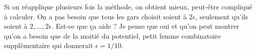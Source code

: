 \documentclass[10pt, conference, letterpaper]{IEEEtran}
\begin{document}
Si on réapplique plusieurs fois la méthode, on obtient mieux, peut-être compliqué à calculer.
On a pas besoin que tous les gars choisit soient à $2\epsilon$, seulement qu'ils soient à 
$2,\dots,2\epsilon$. Est-ce que ça aide ? Je pense que oui et qu'on peut montrer qu'on a besoin
que de la moitié du potentiel, petit lemme combinatoire supplémentaire qui donnerait $\epsilon = 1/10$. 
% 
% 
% 
% 
% 
% 
% 
% 
\end{document}
